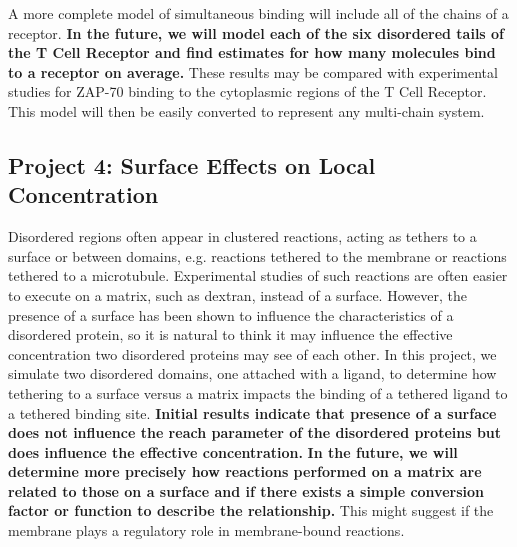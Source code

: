 \documentclass[onecolumn]{article}
\begin{document}
A more complete model of simultaneous binding will include all of the chains of a receptor. \textbf{In the future, we will model each of the six disordered tails of the T Cell Receptor and find estimates for how many molecules bind to a receptor on average.} These results may be compared with experimental studies for ZAP-70 binding to the cytoplasmic regions of the T Cell Receptor. This model will then be easily converted to represent any multi-chain system.

\subsection*{Project 4: Surface Effects on Local Concentration}

Disordered regions often appear in clustered reactions, acting as tethers to a surface or between domains, e.g. reactions tethered to the membrane or reactions tethered to a microtubule. Experimental studies of such reactions are often easier to execute on a matrix, such as dextran, instead of a surface. However, the presence of a surface has been shown to influence the characteristics of a disordered protein, so it is natural to think it may influence the effective concentration two disordered proteins may see of each other. In this project, we simulate two disordered domains, one attached with a ligand, to determine how tethering to a surface versus a matrix impacts the binding of a tethered ligand to a tethered binding site. \textbf{Initial results indicate that presence of a surface does not influence the reach parameter of the disordered proteins but does influence the effective concentration.} \textbf{In the future, we will determine more precisely how reactions performed on a matrix are related to those on a surface and if there exists a simple conversion factor or function to describe the relationship.} This might suggest if the membrane plays a regulatory role in membrane-bound reactions.






\end{document}
